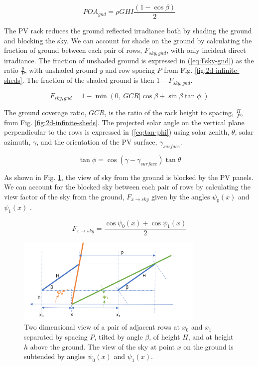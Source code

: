\documentclass[conference]{IEEEtran}
\begin{document}
\begin{equation}
POA_{gnd} = \rho GHI \frac{\left(1-\cos \beta \right)}{2}
\label{eq:POA-gnd}
\end{equation}

The PV rack reduces the ground reflected irradiance both by shading the ground and blocking the sky.  We can account for shade on the ground by calculating the fraction of ground between each pair of rows, $F_{sky,gnd}$, with only incident direct irradiance. The fraction of unshaded ground is expressed in (\ref{eq:Fsky-gnd}) as the ratio $\frac{y}{P}$, with unshaded ground $y$ and row spacing $P$ from Fig. \ref{fig:2d-infinite-sheds}.  The fraction of the shaded ground is then $1-F_{sky,gnd}$.

\begin{equation}
F_{sky,gnd} = 1 - \min(0,\ GCR \left| \cos \beta + \sin \beta \tan \phi \right|)
\label{eq:Fsky-gnd}
\end{equation}

The ground coverage ratio, $GCR$, is the ratio of the rack height to spacing, $\frac{H}{P}$, from Fig. \ref{fig:2d-infinite-sheds}.  The projected solar angle on the vertical plane perpendicular to the rows is expressed in (\ref{eq:tan-phi}) using solar zenith, $\theta$, solar azimuth, $\gamma$, and the orientation of the PV surface, $\gamma_{surface}$.

\begin{equation}
\tan \phi = \cos \left(\gamma - \gamma_{surface} \right) \tan \theta
\label{eq:tan-phi}
\end{equation}

As shown in Fig. \ref{fig:ground-sky-vf}, the view of sky from the ground is blocked by the PV panels.  We can account for the blocked sky between each pair of rows by calculating the view factor of the sky from the ground, $F_{x \rightarrow sky}$ given by the angles $\psi_0(x)$ and $\psi_1\left(x\right)$ \cite{Marion2017}.

\begin{equation}
F_{x \rightarrow sky} = \frac{\cos \psi_0\left(x \right) + \cos \psi_1\left(x \right)}{2}
\label{eq:Fx-sky}
\end{equation}

\begin{figure}
\centering
\includegraphics[width=9cm]{ground_sky_vf.png}
\caption{Two dimensional view of a pair of adjacent rows at $x_0$ and $x_1$ separated by spacing $P$, tilted by angle $\beta$, of height $H$, and at height $h$ above the ground.  The view of the sky at point $x$ on the ground is subtended by angles $\psi_0(x)$ and $\psi_1\left(x\right)$.}
\label{fig:ground-sky-vf}
\end{figure}
\end{document}
